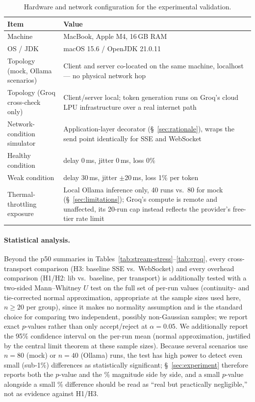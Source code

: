\documentclass[11pt]{article}
\begin{document}
\begin{table}[H]
\centering\small
\caption{Hardware and network configuration for the experimental validation.}
\label{tab:hw-net}
\begin{tabular}{@{}ll@{}}
\toprule
Item & Value \\
\midrule
Machine & MacBook, Apple M4, 16\,GB RAM \\
OS / JDK & macOS 15.6 / OpenJDK 21.0.11 \\
Topology (mock, Ollama scenarios) & Client and server co-located on the same machine, localhost --- no physical network hop \\
Topology (Groq cross-check only) & Client/server local; token generation runs on Groq's cloud LPU infrastructure over a real internet path \\
Network-condition simulator & Application-layer decorator (\S~\ref{sec:rationale}), wraps the send point identically for SSE and WebSocket \\
Healthy condition & delay 0\,ms, jitter 0\,ms, loss 0\% \\
Weak condition & delay 30\,ms, jitter $\pm$20\,ms, loss 1\% per token \\
Thermal-throttling exposure & Local Ollama inference only, 40 runs vs.\ 80 for mock (\S~\ref{sec:limitations}); Groq's compute is remote and unaffected, its 20-run cap instead reflects the provider's free-tier rate limit \\
\bottomrule
\end{tabular}
\end{table}

\paragraph{Statistical analysis.} Beyond the p50 summaries in Tables~\ref{tab:stream-stress}--\ref{tab:groq}, every cross-transport comparison (H3: baseline SSE vs.\ WebSocket) and every overhead comparison (H1/H2: lib vs.\ baseline, per transport) is additionally tested with a two-sided Mann--Whitney $U$ test on the full set of per-run values (continuity- and tie-corrected normal approximation, appropriate at the sample sizes used here, $n\ge20$ per group), since it makes no normality assumption and is the standard choice for comparing two independent, possibly non-Gaussian samples; we report exact $p$-values rather than only accept/reject at $\alpha=0.05$. We additionally report the 95\% confidence interval on the per-run mean (normal approximation, justified by the central limit theorem at these sample sizes). Because several scenarios use $n=80$ (mock) or $n=40$ (Ollama) runs, the test has high power to detect even small (sub-1\%) differences as statistically significant; \S~\ref{sec:experiment} therefore reports both the $p$-value and the \% magnitude side by side, and a small $p$-value alongside a small \% difference should be read as ``real but practically negligible,'' not as evidence against H1/H3.
\end{document}
